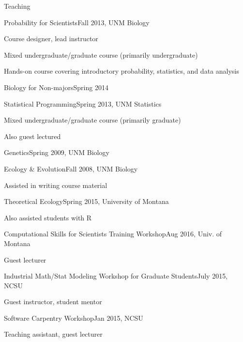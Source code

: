 \documentclass{resume} %
\begin{document}
\clearpage
\begin{rSection}{Teaching}
\begin{rSubsection}{Probability for Scientists}{Fall 2013, UNM Biology}{}{}
\item Course designer, lead instructor
\item Mixed undergraduate/graduate course (primarily undergraduate)
\item Hands-on course covering introductory probability, statistics, and data analysis
\end{rSubsection}
\begin{rSubsection}{Biology for Non-majors}{Spring 2014}{}{}
\nullitem
\end{rSubsection}
\begin{rSubsection}{Statistical Programming}{Spring 2013, UNM Statistics}{}{}
\item Mixed undergraduate/graduate course (primarily graduate)
\item Also guest lectured
\end{rSubsection}
\begin{rSubsection}{Genetics}{Spring 2009, UNM Biology}{}{}
\nullitem
\end{rSubsection}
\begin{rSubsection}{Ecology \& Evolution}{Fall 2008, UNM Biology}{}{}
\item Assisted in writing course material
\end{rSubsection}
\begin{rSubsection}{Theoretical Ecology}{Spring 2015, University of Montana}{}{}
\item Also assisted students with R
\end{rSubsection}
\begin{rSubsection}{Computational Skills for Scientists Training Workshop}{Aug 2016, Univ. of Montana}{}{}
\item Guest lecturer
\end{rSubsection}
\begin{rSubsection}{Industrial Math/Stat Modeling Workshop for Graduate Students}{July 2015, NCSU}{}{}
\item Guest instructor, student mentor
\end{rSubsection}
\begin{rSubsection}{Software Carpentry Workshop}{Jan 2015, NCSU}{}{}
\item Teaching assistant, guest lecturer

\end{rSubsection}
\end{rSection}
\end{document}
